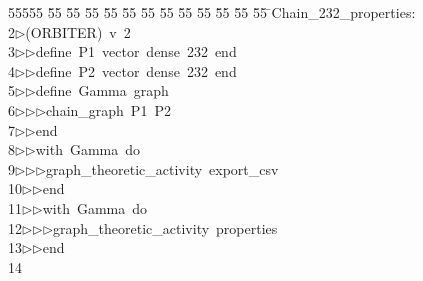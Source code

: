 %
%
\begin{tabbing}
55555 \= 55 \= 55 \= 55 \= 55 \= 55 \= 55 \= 55 \= 55 \= 55 \= 55 \= 55 \= 55 \= \>Chain\_232\_properties:\\[0pt]
2\>$\triangleright$\>(ORBITER)\ v\ 2\ \\[0pt]
3\>$\triangleright$\>$\triangleright$\>define\ P1\ vector\ dense\ 232\ end\ \\[0pt]
4\>$\triangleright$\>$\triangleright$\>define\ P2\ vector\ dense\ 232\ end\ \\[0pt]
5\>$\triangleright$\>$\triangleright$\>define\ Gamma\ graph\ \\[0pt]
6\>$\triangleright$\>$\triangleright$\>$\triangleright$\>chain\_graph\ P1\ P2\ \\[0pt]
7\>$\triangleright$\>$\triangleright$\>end\ \\[0pt]
8\>$\triangleright$\>$\triangleright$\>with\ Gamma\ do\ \\[0pt]
9\>$\triangleright$\>$\triangleright$\>$\triangleright$\>graph\_theoretic\_activity\ export\_csv\ \\[0pt]
10\>$\triangleright$\>$\triangleright$\>end\ \\[0pt]
11\>$\triangleright$\>$\triangleright$\>with\ Gamma\ do\ \\[0pt]
12\>$\triangleright$\>$\triangleright$\>$\triangleright$\>graph\_theoretic\_activity\ properties\ \\[0pt]
13\>$\triangleright$\>$\triangleright$\>end\\[0pt]
14\>\end{tabbing}

